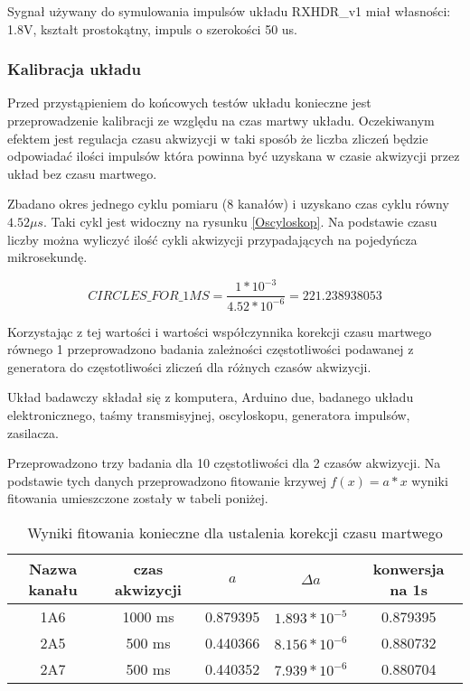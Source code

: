 Sygnał używany do symulowania impulsów układu RXHDR\_v1 miał własności: 1.8V, kształt prostokątny, impuls o szerokości 50 us.


\subsubsection{Kalibracja układu}
\label{section kaliblracja}

Przed przystąpieniem do końcowych testów układu konieczne jest przeprowadzenie kalibracji ze względu na czas martwy układu. 
Oczekiwanym efektem jest regulacja czasu akwizycji w taki sposób że liczba zliczeń będzie odpowiadać ilości impulsów która powinna być uzyskana w czasie akwizycji przez układ bez czasu martwego. 

Zbadano okres jednego cyklu pomiaru (8 kanałów) i uzyskano czas cyklu równy $4.52 \mu s$. Taki cykl jest widoczny na rysunku \ref{Oscyloskop}.
Na podstawie czasu liczby można wyliczyć ilość cykli akwizycji przypadających na pojedyńcza mikrosekundę.

\begin{equation}
        \label{per cykl}
        CIRCLES\_FOR\_1MS = \frac{1*10^{-3}}{4.52 * 10^{-6}} = 221.238938053
\end{equation}

Korzystając z tej wartości i wartości współczynnika korekcji czasu martwego równego 1 przeprowadzono badania zależności częstotliwości podawanej z generatora do częstotliwości zliczeń dla różnych czasów akwizycji.  

Układ badawczy składał się z komputera, Arduino due, badanego układu elektronicznego, taśmy transmisyjnej, oscyloskopu, generatora impulsów, zasilacza. 

Przeprowadzono trzy badania dla 10 częstotliwości dla 2 czasów akwizycji. Na podstawie tych danych przeprowadzono fitowanie krzywej $f(x) = a*x$ wyniki fitowania umieszczone zostały w tabeli poniżej.

\begin{table}
        \caption{Wyniki fitowania konieczne dla ustalenia korekcji czasu martwego}
        \label{dead time fit}
        \centering
        \begin{tabular}{|c|c|c|c|c|}
                \hline
                Nazwa kanału & czas akwizycji & $a$ & $\Delta a$ & konwersja na 1s \\ \hline
                1A6 & 1000 ms & 0.879395 & $1.893 * 10^{-5}$ & 0.879395 \\ \hline
                2A5 & 500 ms & 0.440366 & $8.156 * 10^{-6}$ & 0.880732 \\ \hline
                2A7 & 500 ms & 0.440352 & $7.939 * 10^{-6}$ & 0.880704 \\ \hline
        \end{tabular}
\end{table}

